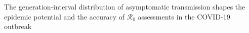 The generation-interval distribution of asymptomatic transmission shapes the epidemic potential and the accuracy of $\mathcal R_0$ assessments in the COVID-19 outbreak
